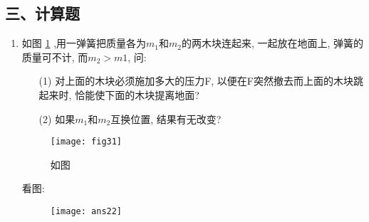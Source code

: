 \subsection*{三、计算题}
\begin{enumerate}
    \item 如图 \ref{Fig:31} ,用一弹簧把质量各为$m_1$和$m_2$的两木块连起来, 一起放在地面上, 弹簧的质量可不计, 而$m_2>m1$, 问:
    \begin{enumerate}
        \item[(1)] 对上面的木块必须施加多大的压力F, 以便在F突然撤去而上面的木块跳起来时, 恰能使下面的木块提离地面?
        \item[(2)] 如果$m_1$和$m_2$互换位置, 结果有无改变?
    \end{enumerate}
    \begin{figure}[H]
        \centering
        \texttt{[image: fig31]}
            \caption{如图}\label{Fig:31}
    \end{figure}
    \begin{solution}
        看图: 
        \begin{figure}[H]
            \centering
            \texttt{[image: ans22]}
        \end{figure}
    \end{solution}


\end{enumerate}
